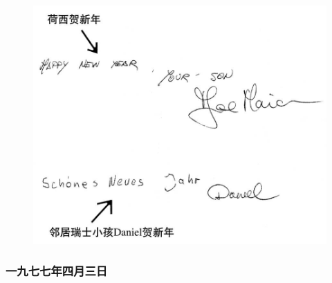 \begin{figure}[htb]
    \centering
    \includegraphics[scale=0.4]{picture/温柔的夜1.jpeg}
\end{figure}


\subsubsection{一九七七年四月三日}

